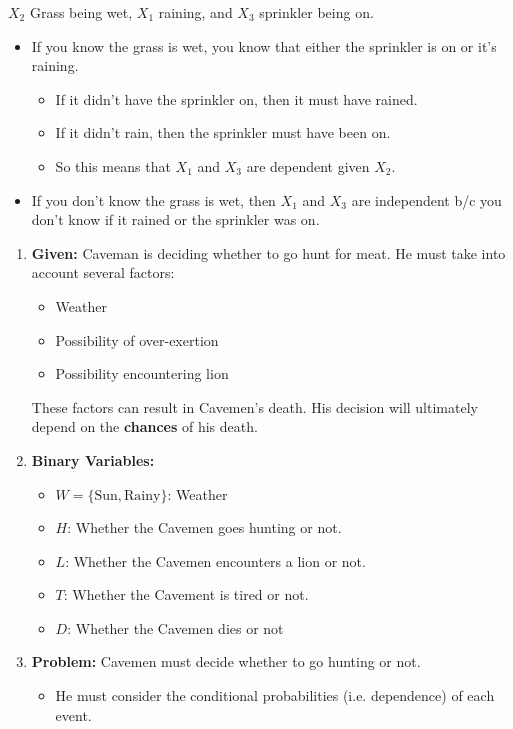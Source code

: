 \begin{example}
    $X_2$ Grass being wet, $X_1$ raining, and $X_3$ sprinkler being on.
    \begin{itemize}
        \item If you know the grass is wet, you know that either the sprinkler is on or it's raining.
        \begin{itemize}
            \item If it didn't have the sprinkler on, then it must have rained.
            \item If it didn't rain, then the sprinkler must have been on.
            \item So this means that $X_1$ and $X_3$ are dependent given $X_2$.
        \end{itemize}
        \item If you don't know the grass is wet, then $X_1$ and $X_3$ are independent b/c you don't know if it rained or the sprinkler was on.
    \end{itemize}
\end{example}

\begin{example}
    \begin{enumerate}
        \item \textbf{Given:} Caveman is deciding whether to go hunt for meat. He must take into account several factors:
        \begin{itemize}
            \item Weather
            \item Possibility of over-exertion
            \item Possibility encountering lion
        \end{itemize}

        These factors can result in Cavemen's death. His decision will ultimately depend on the \textbf{chances} of his death.
        \item \textbf{Binary Variables:}
        \begin{itemize}
            \item $W = \{\text{Sun}, \text{Rainy}\}$: Weather
            \item $H$: Whether the Cavemen goes hunting or not.
            \item $L$: Whether the Cavemen encounters a lion or not.
            \item $T$: Whether the Cavement is tired or not.
            \item $D$: Whether the Cavemen dies or not
        \end{itemize}
        \item \textbf{Problem:} Cavemen must decide whether to go hunting or not. 
        \begin{itemize}
            \item He must consider the conditional probabilities (i.e. dependence) of each event.
        \end{itemize}
    \end{enumerate}
\end{example}

